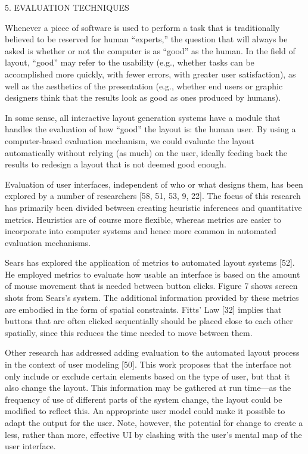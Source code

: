     5. EVALUATION TECHNIQUES

    Whenever a piece of software is used to perform a task that is traditionally believed to be reserved for human “experts,” the question that will always be asked is whether or not the computer is as “good” as the human. In the field of layout, “good” may refer to the usability (e.g., whether tasks can be accomplished more quickly, with fewer errors, with greater user satisfaction), as well as the aesthetics of the presentation (e.g., whether end users or graphic designers think that the results look as good as ones produced by humans).

    In some sense, all interactive layout generation systems have a module that handles the evaluation of how “good” the layout is: the human user. By using a computer-based evaluation mechanism, we could evaluate the layout automatically without relying (as much) on the user, ideally feeding back the results to redesign a layout that is not deemed good enough.

    Evaluation of user interfaces, independent of who or what designs them, has been explored by a number of researchers [58, 51, 53, 9, 22]. The focus of this research has primarily been divided between creating heuristic inferences and quantitative metrics. Heuristics are of course more flexible, whereas metrics are easier to incorporate into computer systems and hence more common in automated evaluation mechanisms.

    Sears has explored the application of metrics to automated layout systems [52]. He employed metrics to evaluate how usable an interface is based on the amount of mouse movement that is needed between button clicks. Figure 7 shows screen shots from Sears’s system. The additional information provided by these metrics are embodied in the form of spatial constraints. Fitts’ Law [32] implies that buttons that are often clicked sequentially should be placed close to each other spatially, since this reduces the time needed to move between them.

    Other research has addressed adding evaluation to the automated layout process in the context of user modeling [50]. This work proposes that the interface not only include or exclude certain elements based on the type of user, but that it also change the layout. This information may be gathered at run time—as the frequency of use of different parts of the system change, the layout could be modified to reflect this. An appropriate user model could make it possible to adapt the output for the user. Note, however, the potential for change to create a less, rather than more, effective UI by clashing with the user’s mental map of the user interface.

